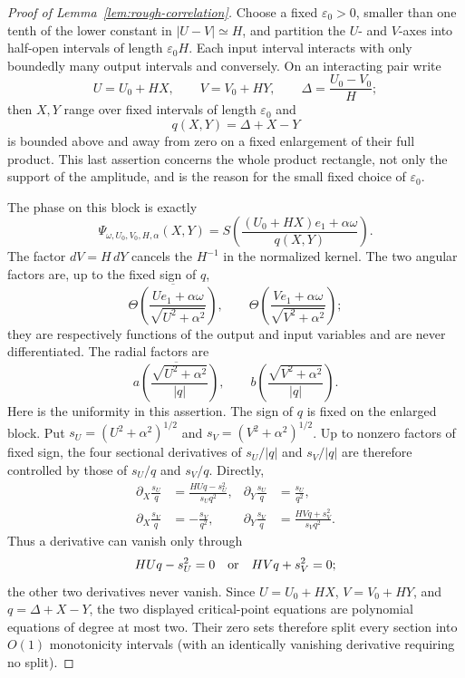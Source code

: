 \documentclass[11pt]{article}
\numberwithin{equation}{section}
\theoremstyle{remark}
\theoremstyle{definition}
\begin{document}
\begin{proof}[Proof of Lemma~\ref{lem:rough-correlation}]
Choose a fixed $\varepsilon_0>0$, smaller than one tenth of the lower
constant in $|U-V|\simeq H$, and partition the $U$- and $V$-axes into
half-open intervals of length $\varepsilon_0H$.  Each input interval
interacts with only boundedly many output intervals and conversely.  On
an interacting pair write
\[
 U=U_0+HX,\qquad V=V_0+HY,\qquad
 \Delta=\frac{U_0-V_0}{H};
\]
then $X,Y$ range over fixed intervals of length $\varepsilon_0$ and
\[
 q(X,Y)=\Delta+X-Y
\]
is bounded above and away from zero on a fixed enlargement of their full
product.  This last assertion concerns the whole product rectangle, not
only the support of the amplitude, and is the reason for the small fixed
choice of $\varepsilon_0$.

The phase on this block is exactly
\begin{equation}\label{eq:equal-block-phase}
 \Psi_{\omega,U_0,V_0,H,\alpha}(X,Y)
 =S\left(\frac{(U_0+HX)e_1+\alpha\omega}{q(X,Y)}\right).
\end{equation}
The factor $dV=H\,dY$ cancels the $H^{-1}$ in the normalized kernel.
The two angular factors are, up to the fixed sign of $q$,
\[
 \overline{\Theta\left(
   \frac{Ue_1+\alpha\omega}{\sqrt{U^2+\alpha^2}}\right)},
 \qquad
 \Theta\left(\frac{Ve_1+\alpha\omega}{\sqrt{V^2+\alpha^2}}\right);
\]
they are respectively functions of the output and input variables and
are never differentiated.  The radial factors are
\[
 \overline{a\left(\frac{\sqrt{U^2+\alpha^2}}{|q|}\right)},\qquad
 b\left(\frac{\sqrt{V^2+\alpha^2}}{|q|}\right).
\]
Here is the uniformity in this assertion.  The sign of $q$ is fixed on
the enlarged block.  Put
$s_U=(U^2+\alpha^2)^{1/2}$ and
$s_V=(V^2+\alpha^2)^{1/2}$.  Up to nonzero factors of fixed sign, the
four sectional derivatives of $s_U/|q|$ and $s_V/|q|$ are therefore
controlled by those of $s_U/q$ and $s_V/q$.  Directly,
\begin{align*}
 \partial_X\frac{s_U}{q}
 &=\frac{HUq-s_U^2}{s_Uq^2},
 &\partial_Y\frac{s_U}{q}&=\frac{s_U}{q^2},\\
 \partial_X\frac{s_V}{q}
 &=-\frac{s_V}{q^2},
 &\partial_Y\frac{s_V}{q}&=\frac{HVq+s_V^2}{s_Vq^2}.
\end{align*}
Thus a derivative can vanish only through
\[
 H Uq-s_U^2=0\quad\hbox{or}\quad H Vq+s_V^2=0;
\]
the other two derivatives never vanish.  Since
$U=U_0+HX$, $V=V_0+HY$, and $q=\Delta+X-Y$, the two displayed
critical-point equations are polynomial equations of degree at most two.
Their zero sets therefore split every section into $O(1)$ monotonicity
intervals (with an identically vanishing derivative requiring no split).

\end{proof}
\end{document}
